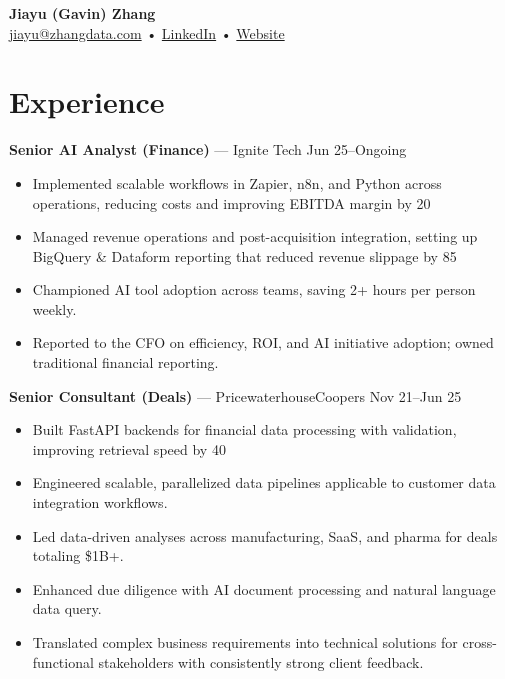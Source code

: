 \documentclass[10pt,letterpaper]{article}
\makeatletter
\newcommand{\name}{Jiayu (Gavin) Zhang}
\newcommand{\emailaddr}{jiayu@zhangdata.com}
\newcommand{\linkedin}{https://www.linkedin.com/in/jiayu-g-zhang}
\newcommand{\website}{https://www.zhangdata.com}
\makeatother
\begin{document}
\begin{center}
  {\LARGE\bfseries \name}\\[2pt]
  \href{mailto:\emailaddr}{\emailaddr} • \href{\linkedin}{LinkedIn} • \href{\website}{Website}
\end{center}


\section*{Experience}

\textbf{Senior AI Analyst (Finance)} — Ignite Tech \hfill Jun 25--Ongoing\\
\begin{itemize}
  \item Implemented scalable workflows in Zapier, n8n, and Python across operations, reducing costs and improving EBITDA margin by 20%
  \item Managed revenue operations and post-acquisition integration, setting up BigQuery \& Dataform reporting that reduced revenue slippage by 85%
  \item Championed AI tool adoption across teams, saving 2+ hours per person weekly.
  \item Reported to the CFO on efficiency, ROI, and AI initiative adoption; owned traditional financial reporting.
\end{itemize}

\textbf{Senior Consultant (Deals)} — PricewaterhouseCoopers \hfill Nov 21--Jun 25\\
\begin{itemize}
  \item Built FastAPI backends for financial data processing with validation, improving retrieval speed by 40%
  \item Engineered scalable, parallelized data pipelines applicable to customer data integration workflows.
  \item Led data-driven analyses across manufacturing, SaaS, and pharma for deals totaling \$1B+.
  \item Enhanced due diligence with AI document processing and natural language data query.
  \item Translated complex business requirements into technical solutions for cross-functional stakeholders with consistently strong client feedback.
\end{itemize}
\end{document}
